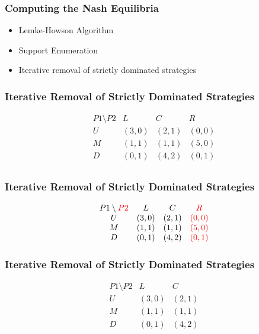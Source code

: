 \begin{frame}
    \frametitle{Computing the Nash Equilibria}
    \begin{itemize}
        \item Lemke-Howson Algorithm
        \item Support Enumeration 
        \item Iterative removal of strictly dominated strategies
    \end{itemize}

\end{frame}


\begin{frame}
    \frametitle{Iterative Removal of Strictly Dominated Strategies}
    \begin{equation*}
        \begin{matrix}
            P1\setminus P2 & L & C & R \\
            U & (3,0) & (2,1) & (0,0) \\
            M & (1,1) & (1,1) & (5,0) \\
            D & (0,1) & (4,2) & (0,1) \\
        \end{matrix}
    \end{equation*}
\end{frame}


\begin{frame}
    \frametitle{Iterative Removal of Strictly Dominated Strategies}
    \begin{equation*}
        \begin{matrix}
            P1\setminus \textcolor{red}{P2} & L & C & \textcolor{red}{R} \\
            U & (3,0) & (2,1) & \textcolor{red}{(0,0)} \\
            M & (1,1) & (1,1) & \textcolor{red}{(5,0)} \\
            D & (0,1) & (4,2) & \textcolor{red}{(0,1)} \\
        \end{matrix}
    \end{equation*}
\end{frame}


\begin{frame}
    \frametitle{Iterative Removal of Strictly Dominated Strategies}
    \begin{equation*}
        \begin{matrix}
            P1\setminus P2 & L & C \\
            U & (3,0) & (2,1) \\
            M & (1,1) & (1,1) \\
            D & (0,1) & (4,2) \\
        \end{matrix}
    \end{equation*}
\end{frame}


